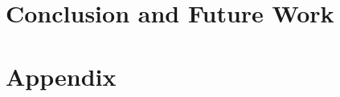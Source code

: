 \documentclass[english]{sobraep}
\begin{document}
\section{Conclusion and Future Work}


\balance

\printbibliography %

\section*{Appendix}
\end{document}
